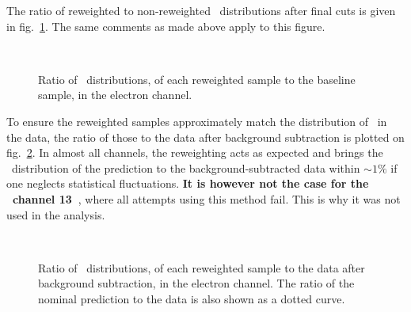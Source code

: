 The ratio of reweighted to non-reweighted \ut\ distributions after final cuts is given in fig.~\ref{fig:BiasrewOvernonRewReco}. The same comments as made above apply to this figure.

\begin{figure}[h]
  \centering
   \\
  \caption{Ratio of \ut\ distributions, of each reweighted sample to the baseline sample, in the electron channel.}
  \label{fig:BiasrewOvernonRewReco}
\end{figure}

To ensure the reweighted samples approximately match the distribution of \ut\ in the data, the ratio of those to the data after background subtraction is plotted on fig.~\ref{fig:BiasrewOverdataReco}. In almost all channels, the reweighting acts as expected and brings the \ut\ distribution of the prediction to the background-subtracted data within $\sim 1\%$ if one neglects statistical fluctuations. \textbf{It is however not the case for the \Wplus\ channel 13~\TeV}, where all attempts using this method fail. This is why it was not used in the analysis.

\begin{figure}[h]
  \centering
  \\
  \caption{Ratio of \ut\ distributions, of each reweighted sample to the data after background subtraction, in the electron channel. The ratio of the nominal prediction to the data is also shown as a dotted curve.}
  \label{fig:BiasrewOverdataReco}
\end{figure}
